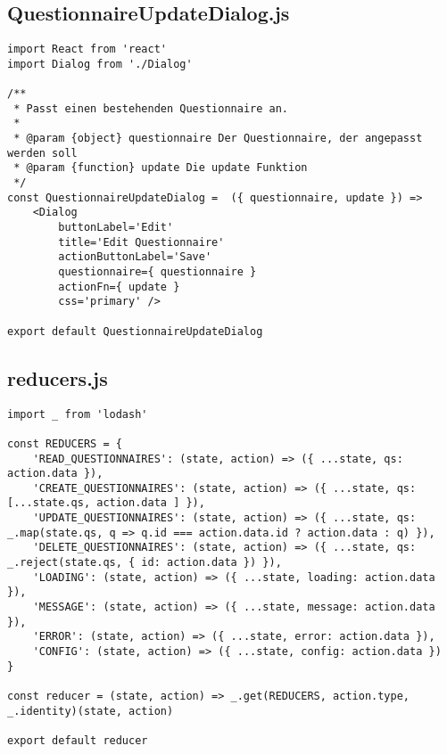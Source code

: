\subsection{QuestionnaireUpdateDialog.js}
\begin{verbatim}
import React from 'react'
import Dialog from './Dialog'

/**
 * Passt einen bestehenden Questionnaire an.
 * 
 * @param {object} questionnaire Der Questionnaire, der angepasst werden soll
 * @param {function} update Die update Funktion
 */
const QuestionnaireUpdateDialog =  ({ questionnaire, update }) => 
    <Dialog 
        buttonLabel='Edit' 
        title='Edit Questionnaire' 
        actionButtonLabel='Save'
        questionnaire={ questionnaire } 
        actionFn={ update } 
        css='primary' />

export default QuestionnaireUpdateDialog

\end{verbatim}

\subsection{reducers.js}

\begin{verbatim}
import _ from 'lodash'

const REDUCERS = {
    'READ_QUESTIONNAIRES': (state, action) => ({ ...state, qs: action.data }),
    'CREATE_QUESTIONNAIRES': (state, action) => ({ ...state, qs: [...state.qs, action.data ] }),
    'UPDATE_QUESTIONNAIRES': (state, action) => ({ ...state, qs: _.map(state.qs, q => q.id === action.data.id ? action.data : q) }),
    'DELETE_QUESTIONNAIRES': (state, action) => ({ ...state, qs: _.reject(state.qs, { id: action.data }) }),
    'LOADING': (state, action) => ({ ...state, loading: action.data }),
    'MESSAGE': (state, action) => ({ ...state, message: action.data }),
    'ERROR': (state, action) => ({ ...state, error: action.data }),
    'CONFIG': (state, action) => ({ ...state, config: action.data })
}

const reducer = (state, action) => _.get(REDUCERS, action.type, _.identity)(state, action)

export default reducer
\end{verbatim}


